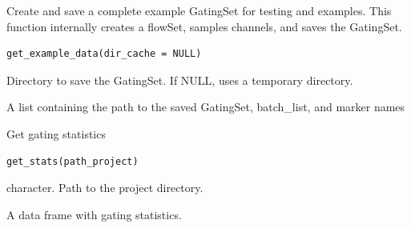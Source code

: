 \documentclass[letterpaper]{book}
\begin{document}
%
\begin{Description}
Create and save a complete example GatingSet for testing and examples.
This function internally creates a flowSet, samples channels, and saves the GatingSet.
\end{Description}
%
\begin{Usage}
\begin{verbatim}
get_example_data(dir_cache = NULL)
\end{verbatim}
\end{Usage}
%
\begin{Arguments}
\begin{ldescription}
\item[\code{dir\_cache}] Directory to save the GatingSet. If NULL, uses a temporary directory.
\end{ldescription}
\end{Arguments}
%
\begin{Value}
A list containing the path to the saved GatingSet, batch\_list, and marker names
\end{Value}
%
\begin{Description}
Get gating statistics
\end{Description}
%
\begin{Usage}
\begin{verbatim}
get_stats(path_project)
\end{verbatim}
\end{Usage}
%
\begin{Arguments}
\begin{ldescription}
\item[\code{path\_project}] character. Path to the project directory.
\end{ldescription}
\end{Arguments}
%
\begin{Value}
A data frame with gating statistics.
\end{Value}
%
\begin{Examples}
\end{Examples}
\end{document}
